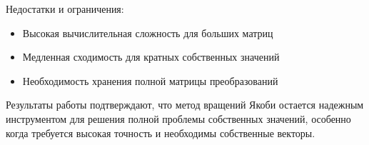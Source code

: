 Недостатки и ограничения:
\begin{itemize}
\item Высокая вычислительная сложность для больших матриц
\item Медленная сходимость для кратных собственных значений
\item Необходимость хранения полной матрицы преобразований
\end{itemize}

Результаты работы подтверждают, что метод вращений Якоби остается надежным инструментом для 
решения полной проблемы собственных значений, особенно когда требуется высокая точность и необходимы 
собственные векторы.

\pagebreak
